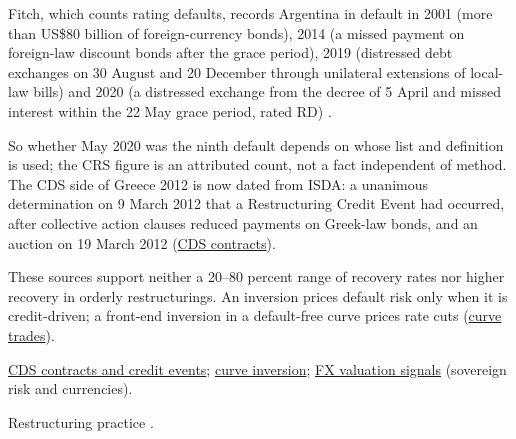 \begin{qfdefinition}
Fitch, which counts rating defaults, records Argentina in default in 2001 (more than US\$80 billion of foreign-currency bonds), 2014 (a missed payment on foreign-law discount bonds after the grace period), 2019 (distressed debt exchanges on 30 August and 20 December through unilateral extensions of local-law bills) and 2020 (a distressed exchange from the decree of 5 April and missed interest within the 22 May grace period, rated RD) \citep[pp.~2--3]{fitch-sovereign-2020-study}.

So whether May 2020 was the ninth default depends on whose list and definition is used; the CRS figure is an attributed count, not a fact independent of method. The CDS side of Greece 2012 is now dated from ISDA: a unanimous determination on 9 March 2012 that a Restructuring Credit Event had occurred, after collective action clauses reduced payments on Greek-law bonds, and an auction on 19 March 2012 \citep[releases of 9 and 19 March 2012]{isda-greece-2012} (\hyperref[mech:cds-contract-credit-events]{CDS contracts}).

These sources support neither a 20--80 percent range of recovery rates nor higher recovery in orderly restructurings. An inversion prices default risk only when it is credit-driven; a front-end inversion in a default-free curve prices rate cuts (\hyperref[meth:curve-trades-carry-rolldown]{curve trades}).

 \hyperref[mech:cds-contract-credit-events]{CDS contracts and credit events}; \hyperref[meth:curve-trades-carry-rolldown]{curve inversion}; \hyperref[meth:fx-valuation-signals]{FX valuation signals} (sovereign risk and currencies).

 Restructuring practice \citep{gap-sovereign-restructuring-playbook}.

\end{qfdefinition}

